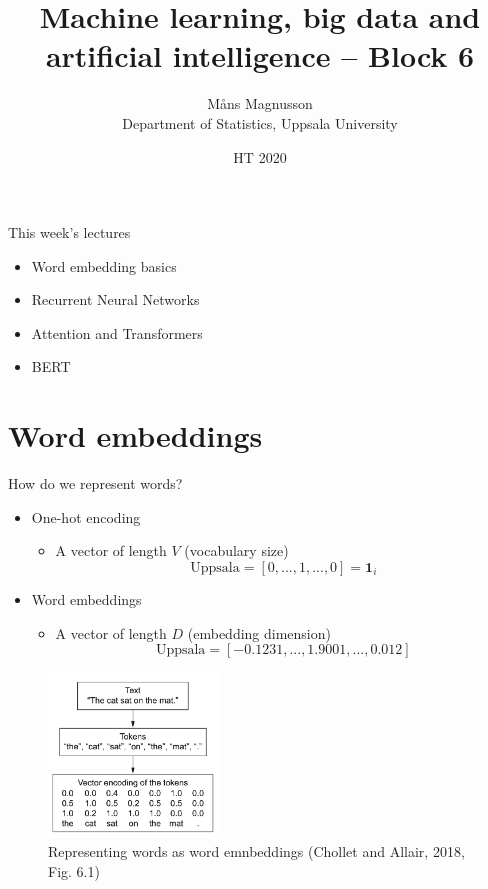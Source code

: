 \documentclass[10pt]{beamer}
\title[]{{\color{black}Machine learning, big data and artificial intelligence -- Block 6}}
\author[]{M{\aa}ns Magnusson\\Department of Statistics, Uppsala University}
\date{HT 2020}
\begin{document}
\frame{\titlepage
}



\begin{frame}{This week's lectures}
\begin{itemize}
\item Word embedding basics
\item Recurrent Neural Networks
\item Attention and Transformers
\item BERT
\end{itemize}
\end{frame}







\section{Word embeddings}


\begin{frame}{How do we represent words?}
\begin{itemize}
\item {\color{uured} One-hot} encoding
\begin{itemize}
\item A vector of length $V$ (vocabulary size)
\[
\text{Uppsala} = [0,...,1,...,0] = \mathbf{1}_i
\]
\end{itemize}
\pause
\item {\color{uured} Word embeddings}
\begin{itemize}
\item A vector of length $D$ (embedding dimension)
\[
\text{Uppsala} = [-0.1231,...,1.9001,...,0.012]
\]
\end{itemize}
\end{itemize}

\begin{figure}[h]
\centering
\includegraphics[width=0.4\textwidth]{fig/DLR_6_1_WE.png}
\caption{Representing words as word emnbeddings (Chollet and Allair, 2018, Fig. 6.1)}
\end{figure}

\end{frame}
\end{document}
